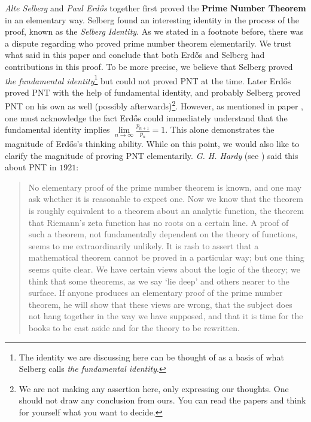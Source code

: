 \documentclass{subfile}
\begin{document}
	\textit{Alte Selberg} and \textit{Paul Erd\H{o}s} together first proved the \textbf{Prime Number Theorem} in an elementary way. Selberg found an interesting identity in the process of the proof, known as the \textit{Selberg Identity}. As we stated in a footnote before, there was a dispute regarding who proved prime number theorem elementarily. We trust what \textcite{goldfeld_2004} said in this paper and conclude that both Erd\H{o}s and Selberg had contributions in this proof. To be more precise, we believe that Selberg proved \textit{the fundamental identity}\footnote{The identity we are discussing here can be thought of as a basis of what Selberg calls \textit{the fundamental identity}.} but could not proved PNT at the time. Later Erd\H{o}s proved PNT with the help of fundamental identity, and probably Selberg proved PNT on his own as well (possibly afterwards)\footnote{We are not making any assertion here, only expressing our thoughts. One should not draw any conclusion from ours. You can read the papers and think for yourself what you want to decide.}. However, as mentioned in paper \textcite[Page $6$]{goldfeld_2004}, one must acknowledge the fact Erd\H{o}s could immediately understand that the fundamental identity implies $\lim\limits_{n\to\infty}\frac{p_{n+1}}{p_n}=1$. This alone demonstrates the magnitude of Erd\H{o}s's thinking ability. While on this point, we would also like to clarify the magnitude of proving PNT elementarily. \textit{G. H. Hardy} (see \textcite[Page $3$]{goldfeld_2004}) said this about PNT in $1921$:
		\begin{quote}
			No elementary proof of the prime number theorem is known, and one may ask whether it is reasonable to expect one. Now we know that the theorem is roughly equivalent to a theorem about an analytic function, the theorem that Riemann's zeta function has no roots on a certain line. A proof of such a theorem, not fundamentally dependent on the theory of functions, seems to me extraordinarily unlikely. It is rash to assert that a mathematical theorem cannot be proved in a particular way; but one thing seems quite clear. We have certain views about the logic of the theory; we think that some theorems, as we say `lie deep' and others nearer to the surface. If anyone produces an elementary proof of the prime number theorem, he will show that these views are wrong, that the subject does not hang together in the way we have supposed, and that it is time for the books to be cast aside and for the theory to be rewritten.
		\end{quote}
\end{document}
